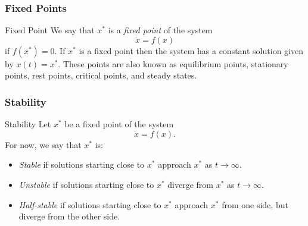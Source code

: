 \documentclass[class=article, crop=false]{standalone}
\begin{document}
  \subsubsection{Fixed Points}
  \begin{definition}{Fixed Point}
    We say that $x^*$ is a \emph{fixed point} of the system
    \[
      \dot{x} = f(x)
    \]
    if $f(x^*) = 0$. If $x^*$ is a fixed point then the system has a constant solution given by $x(t) = x^*$. These points are also known as equilibrium points, stationary points, rest points, critical points, and steady states.
  \end{definition}
  \subsubsection{Stability}
  \begin{definition}{Stability}
    Let $x^*$ be a fixed point of the system
    \[
      \dot{x} = f(x).
    \]
    For now, we say that $x^*$ is:
    \begin{itemize}
      \item \emph{Stable} if solutions starting close to $x^*$ approach $x^*$ as $t\to\infty$.
      \item \emph{Unstable} if solutions starting close to $x^*$ diverge from $x^*$ as $t\to\infty$.
      \item \emph{Half-stable} if solutions starting close to $x^*$ approach $x^*$ from one side, but diverge from the other side.
    \end{itemize}
  \end{definition}
\end{document}
